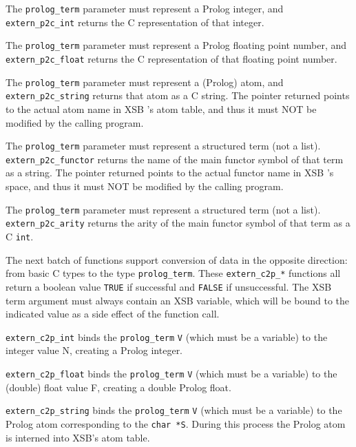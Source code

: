 \begin{description}
%
The {\tt prolog\_term} parameter must represent a Prolog integer, and
{\tt extern\_p2c\_int} returns the C representation of that integer.

%
The {\tt prolog\_term} parameter must represent a Prolog floating point
number, and {\tt extern\_p2c\_float} returns the C representation of
that floating point number.

%
The {\tt prolog\_term} parameter must represent a (Prolog) atom, and
{\tt extern\_p2c\_string} returns that atom as a C string. The pointer
returned points to the actual atom name in XSB 's atom table, and thus
it must NOT be modified by the calling program.

%
The {\tt prolog\_term} parameter must represent a structured term (not a
list).  {\tt extern\_p2c\_functor} returns the name of the main
functor symbol of that term as a string. The pointer returned points
to the actual functor name in XSB 's space, and thus it must NOT be
modified by the calling program.

%
The {\tt prolog\_term} parameter must represent a structured term (not
a list).  {\tt extern\_p2c\_arity} returns the arity of the main
functor symbol of that term as a C {\tt int}.
\end{description}

The next batch of functions support conversion of data in the opposite
direction: from basic C types to the type {\tt prolog\_term}.  These
{\tt extern\_c2p\_*} functions all return a boolean value {\tt TRUE}
if successful and {\tt FALSE} if unsuccessful.  The XSB term argument
must always contain an XSB variable, which will be bound to the
indicated value as a side effect of the function call.

\begin{description}
%
 {\tt extern\_c2p\_int} binds the {\tt prolog\_term} {\tt V} (which must be
 a variable) to the integer value N, creating a Prolog integer.

 {\tt extern\_c2p\_float} binds the
      {\tt prolog\_term} {\tt V} (which must be a variable) to the (double)
      float value F, creating a double Prolog float.

%
{\tt extern\_c2p\_string} binds the {\tt prolog\_term} {\tt V} (which
must be a variable) to the Prolog atom corresponding to the {\tt char
  *S}.  During this process the Prolog atom is interned into XSB's
atom table.
\end{description}


